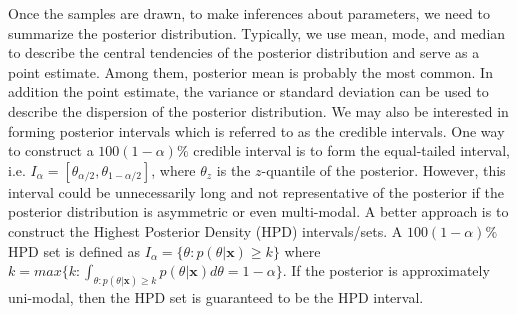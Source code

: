\documentclass[floatsintext, man]{apa7}
\begin{document}
Once the samples are drawn, to make inferences about parameters, we need to
summarize the posterior distribution. Typically, we use mean, mode, and median
to describe the central tendencies of the posterior distribution and serve as a
point estimate. Among them, posterior mean is probably the most common. In
addition the point estimate, the variance or standard deviation can be used to
describe the dispersion of the posterior distribution. We may also be interested
in forming posterior intervals which is referred to as the credible intervals.
One way to construct a $100(1-\alpha)\%$ credible interval is to form the
equal-tailed interval, i.e. $I_\alpha = [\theta_{\alpha/2}, \theta_
{1-\alpha/2}]$, where $\theta_z$ is the $z$-quantile of the posterior. However,
this interval could be unnecessarily long and not representative of the
posterior if the posterior distribution is asymmetric or even multi-modal.
A better approach is to construct the Highest Posterior Density (HPD)
intervals/sets. A $100(1-\alpha)\%$ HPD set is defined as $I_\alpha = \{\theta: p
(\theta|\bm{x}) \geq k\}$ where $k = max\{k:\int_{\theta:p(\theta|\bm{x})
\geq k} p(\theta|\bm{x})d\theta = 1 - \alpha\}$. If the posterior is
approximately uni-modal, then the HPD set is guaranteed to be the HPD interval.
\end{document}
